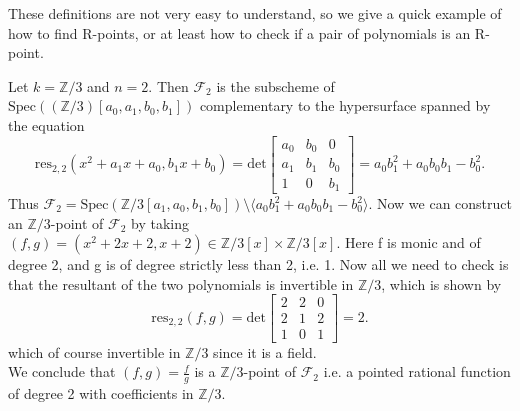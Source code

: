 %
These definitions are not very easy to understand, so we give a quick example of how to find R-points, or at least how to check if a pair of polynomials is an R-point. 
%
\begin{example}\label{Ex:R-point}
%
Let \(k=\mathbb{Z}/3\) and \(n=2\). Then \(\mathcal{F}_2\) is the subscheme of \(\text{Spec}((\mathbb{Z}/3)[a_0,a_1,b_0,b_1])\) complementary to the hypersurface spanned by the equation 
%
\begin{equation*}
%
    \text{res}_{2,2}(x^2+a_1x+a_0, b_1x+b_0) = \text{det}
%
    \begin{bmatrix}
    a_0 & b_0 & 0 \\
    a_1 & b_1 & b_0  \\
    1 & 0 & b_1
    \end{bmatrix}
%
= a_0 b_1^2 + a_0 b_0 b_1 - b_0^2.
%
\end{equation*}
%
Thus \(\mathcal{F}_2 = \text{Spec}(\mathbb{Z}/3[a_1,a_0,b_1,b_0])\setminus \langle a_0 b_1^2 + a_0 b_0 b_1 - b_0^2 \rangle \).
%
Now we can construct an \(\mathbb{Z}/3\)-point of \(\mathcal{F}_2\) by taking \((f,g)=(x^2+2x+2, x+2)\in \mathbb{Z}/3[x] \times \mathbb{Z}/3[x]\). Here f is monic and of degree 2, and g is of degree strictly less than 2, i.e. 1. Now all we need to check is that the resultant of the two polynomials is invertible in \(\mathbb{Z}/3\), which is shown by
%
\begin{equation*}
%
    \text{res}_{2,2}(f,g)= \text{det}
%
    \begin{bmatrix}
    2 & 2 & 0 \\
    2 & 1 & 2  \\
    1 & 0 & 1
    \end{bmatrix}
%
= 2.
%
\end{equation*}
%
which of course invertible in \(\mathbb{Z}/3\) since it is a field. \\
We conclude that \((f,g)= \frac{f}{g}\) is a \(\mathbb{Z}/3\)-point of \(\mathcal{F}_2\) i.e. a pointed rational function of degree 2 with coefficients in \(\mathbb{Z}/3\).
%
\end{example}
%
%
